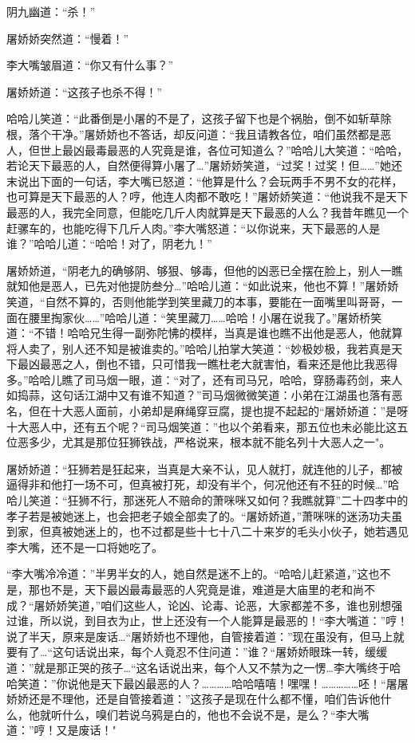 \documentclass[12pt,oneside]{book}
\begin{document}
阴九幽道：``杀！''

屠娇娇突然道：``慢着！''

李大嘴皱眉道：``你又有什么事？''

屠娇娇道：``这孩子也杀不得！''

哈哈儿笑道：``此番倒是小屠的不是了，这孩子留下也是个祸胎，倒不如斩草除根，落个干净。''屠娇娇也不答话，却反问道：``我且请教各位，咱们虽然都是恶人，但世上最凶最毒最恶的人究竟是谁，各位可知道么？''哈哈儿大笑道：``哈哈，若论天下最恶的人，自然便得算小屠了\ldots{}''屠娇娇笑道，``过奖！过奖！但\ldots\ldots{}''她还末说出下面的一句话，李大嘴已怒道：``他算是什么？会玩两手不男不女的花样，也可算是天下最恶的人？哼，他连人肉都不敢吃！''屠娇娇笑道：``他说我不是天下最恶的人，我完全同意，但能吃几斤人肉就算是天下最恶的人么？我昔年瞧见一个赶骡车的，也能吃得下几斤人肉。''李大嘴怒道：``以你说来，天下最恶的人是谁？''哈哈儿道：``哈哈！对了，阴老九！''

屠娇娇道，``阴老九的确够阴、够狠、够毒，但他的凶恶已全摆在脸上，别人一瞧就知他是恶人，已先对他提防叁分\ldots{}''哈哈儿道：``如此说来，他也不算！''屠娇娇笑道，``自然不算的，否则他能学到笑里藏刀的本事，要能在一面嘴里叫哥哥，一面在腰里掏家伙\ldots\ldots{}''哈哈儿道：``笑里藏刀\ldots\ldots 哈哈！小屠在说我了。''屠娇桥笑道：``不错！哈哈兄生得一副弥陀怫的模样，当真是谁也瞧不出他是恶人，他就算将人卖了，别人还不知是被谁卖的。''哈哈儿拍掌大笑道：``妙极妙极，我若真是天下最凶最恶之人，倒也不错，只可惜我一瞧杜老大就害怕，看来还是他比我恶得多。''哈哈儿瞧了司马烟一眼，道：``对了，还有司马兄，哈哈，穿肠毒药剑，来人如捣蒜，这句话江湖中又有谁不知道？''司马烟微微笑道：小弟在江湖虽也落有恶名，但在十大恶人面前，小弟却是麻绳穿豆腐，提也提不起起的``屠娇娇道：''是呀十大恶人中，还有五个呢？``司马烟笑道：''也以个弟看来，那五位也未必能比这五位恶多少，尤其是那位狂狮铁战，严格说来，根本就不能名列十大恶人之一"。

屠娇娇道：``狂狮若是狂起来，当真是大亲不认，见人就打，就连他的儿子，都被逼得非和他打一场不可，但真被打死，却没有半个，何况他还有不狂的时候\ldots{}''哈哈儿笑道：``狂狮不行，那迷死人不赔命的萧咪咪又如何？我瞧就算''二十四孝中的孝子若是被她迷上，也会把老子娘全部卖了的。``屠娇娇道，''萧咪咪的迷汤功夫虽到家，但真被她迷上的，也不过都是些十七十八二十来岁的毛头小伙子，她若遇见李大嘴，还不是一口将她吃了。

``李大嘴冷冷道：''半男半女的人，她自然是迷不上的。``哈哈儿赶紧道，''这也不是，那也不是，天下最凶最毒最恶的人究竟是谁，难道是大庙里的老和尚不成？``屠娇娇笑道，''咱们这些人，论凶、论毒、论恶，大家都差不多，谁也别想强过谁，所以说，到目衣为止，世上还没有一个人能算是最恶的！``李大嘴道：''哼！说了半天，原来是废话\ldots{}``屠娇娇也不理他，自管接着道：''现在虽没有，但马上就要有了\ldots{}``这句话说出来，每个人竟忍不住问道：''谁？``屠娇娇眼珠一转，缓缓道：''就是那正哭的孩子\ldots{}``这名话说出来，每个人又不禁为之一愣\ldots 李大嘴终于哈哈笑道：''你说他是天下最凶最恶的人？\ldots\ldots\ldots\ldots 哈哈嘻嘻！嘿嘿！\ldots\ldots\ldots\ldots\ldots 呸！``屠屠娇娇还是不理他，还是自管接着道：''这孩子是现在什么都不懂，咱们告诉他什么，他就听什么，嗅们若说乌鸦是白的，他也不会说不是，是么？``李大嘴道：''哼！又是废话！"
\end{document}
